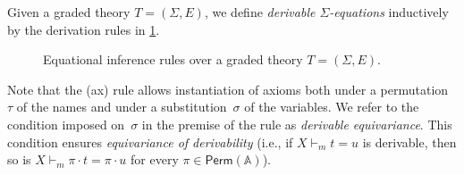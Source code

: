 \documentclass[11pt,a4paper]{amsart}
\newcommand{\Perm}{\mathsf{Perm}(\Names)}
\newcommand{\sigf}{\Sigma_{\mathsf f}}
\newcommand{\sigb}{\Sigma_{\mathsf b}}
\newcommand{\Names}{\mathbb{A}}
\newcommand{\fresh}{\mathbin{\#}}
\theoremstyle{plain}
\numberwithin{equation}{section}
\newcommand{\lrule}[3]{(\text{#1})\;\frac{#2}{#3}}
\newcommand{\+}[1]{\mathcal{#1}\xspace}
\theoremstyle{definition}
\begin{document}
\noindent Given a graded theory \(T = (\Sigma, E)\), we define
\emph{derivable $\Sigma$-equations} inductively by the derivation
rules in \cref{fig:derivationrules}.
\begin{figure}
    \begin{framed}
    \end{framed}
    \caption{Equational inference rules over a graded theory \(T = (\Sigma, E)\).}
    \label{fig:derivationrules}
\end{figure}
Note that the (ax) rule allows instantiation of axioms both under a
permutation~$\tau$ of the names and under a substitution~$\sigma$ of
the variables. We refer to the condition imposed on~$\sigma$ in the
premise of the rule as \emph{derivable equivariance}. This condition
ensures \emph{equivariance of derivability} (i.e., if
$X \vdash_m t =u$ is derivable, then so is
$X \vdash_m \pi \cdot t = \pi \cdot u$ for every $\pi \in \Perm$).
\end{document}
